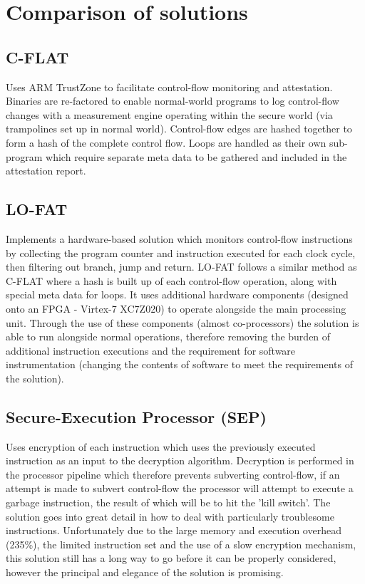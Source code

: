 \section{Comparison of solutions}

\subsection{C-FLAT}
Uses ARM TrustZone to facilitate control-flow monitoring and attestation. Binaries are re-factored to enable normal-world programs to log control-flow changes with a measurement engine operating within the secure world (via trampolines set up in normal world). Control-flow edges are hashed together to form a hash of the complete control flow. Loops are handled as their own sub-program which require separate meta data to be gathered and included in the attestation report.

\subsection{LO-FAT}
Implements a hardware-based solution which monitors control-flow instructions by collecting the program counter and instruction executed for each clock cycle, then filtering out branch, jump and return. LO-FAT follows a similar method as C-FLAT where a hash is built up of each control-flow operation, along with special meta data for loops. It uses additional hardware components (designed onto an FPGA - Virtex-7 XC7Z020) to operate alongside the main processing unit. Through the use of these components (almost co-processors) the solution is able to run alongside normal operations, therefore removing the burden of additional instruction executions and the requirement for software instrumentation (changing the contents of software to meet the requirements of the solution).

\subsection{Secure-Execution Processor (SEP)}
Uses encryption of each instruction which uses the previously executed instruction as an input to the decryption algorithm. Decryption is performed in the processor pipeline which therefore prevents subverting control-flow, if an attempt is made to subvert control-flow the processor will attempt to execute a garbage instruction, the result of which will be to hit the 'kill switch'. The solution goes into great detail in how to deal with particularly troublesome instructions. Unfortunately due to the large memory and execution overhead (235\%), the limited instruction set and the use of a slow encryption mechanism, this solution still has a long way to go before it can be properly considered, however the principal and elegance of the solution is promising.

